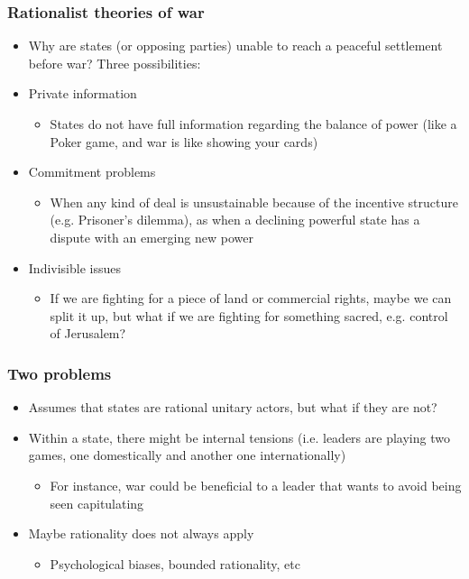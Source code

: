 \documentclass[aspectratio=43]{beamer}
\begin{document}
\begin{frame}
\frametitle{Rationalist theories of war}
\centering

\begin{itemize}
\item<1-> Why are states (or opposing parties) unable to reach a peaceful settlement before war? Three possibilities:
\item<2> Private information
  \begin{itemize}
  \item States do not have full information regarding the balance of power (like a Poker game, and war is like showing your cards)
  \end{itemize}
\item<3> Commitment problems
  \begin{itemize}
  \item When any kind of deal is unsustainable because of the incentive structure (e.g. Prisoner's dilemma), as when a declining powerful state has a dispute with an emerging new power
  \end{itemize}
\item<4> Indivisible issues
  \begin{itemize}
  \item If we are fighting for a piece of land or commercial rights, maybe we can split it up, but what if we are fighting for something sacred, e.g. control of Jerusalem?
  \end{itemize}
\end{itemize}

\end{frame}

\begin{frame}
\frametitle{Two problems}
\centering

\begin{itemize}
\item<1-> Assumes that states are rational unitary actors, but what if they are not?
\item<2-> Within a state, there might be internal tensions (i.e. leaders are playing two games, one domestically and another one internationally)
  \begin{itemize}
  \item For instance, war could be beneficial to a leader that wants to avoid being seen capitulating
  \end{itemize}
\item<3-> Maybe rationality does not always apply
  \begin{itemize}
  \item Psychological biases, bounded rationality, etc
  \end{itemize}
\end{itemize}

\end{frame}
\end{document}
